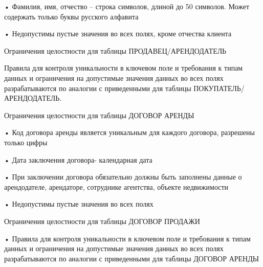 •	Фамилия, имя, отчество – строка символов, длиной до 50 символов. Может содержать только буквы русского алфавита

•	Недопустимы пустые значения во всех полях, кроме отчества клиента

Ограничения целостности для таблицы ПРОДАВЕЦ/АРЕНДОДАТЕЛЬ

Правила для контроля уникальности в ключевом поле и требования к типам данных и ограничения на допустимые значения данных во всех полях разрабатываются по аналогии с приведенными для таблицы ПОКУПАТЕЛЬ/АРЕНДОДАТЕЛЬ.

Ограничения целостности для таблицы ДОГОВОР АРЕНДЫ

•	Код договора аренды является уникальным для каждого договора, разрешены только цифры

•	Дата заключения договора- календарная дата

•	При заключении договора обязательно должны быть заполнены данные о арендодателе, арендаторе, сотруднике агентства, объекте недвижимости

•	Недопустимы пустые значения во всех полях

Ограничения целостности для таблицы ДОГОВОР ПРОДАЖИ

•	Правила для контроля уникальности в ключевом поле и требования к типам данных и ограничения на допустимые значения данных во всех полях разрабатываются по аналогии с приведенными для таблицы ДОГОВОР АРЕНДЫ


